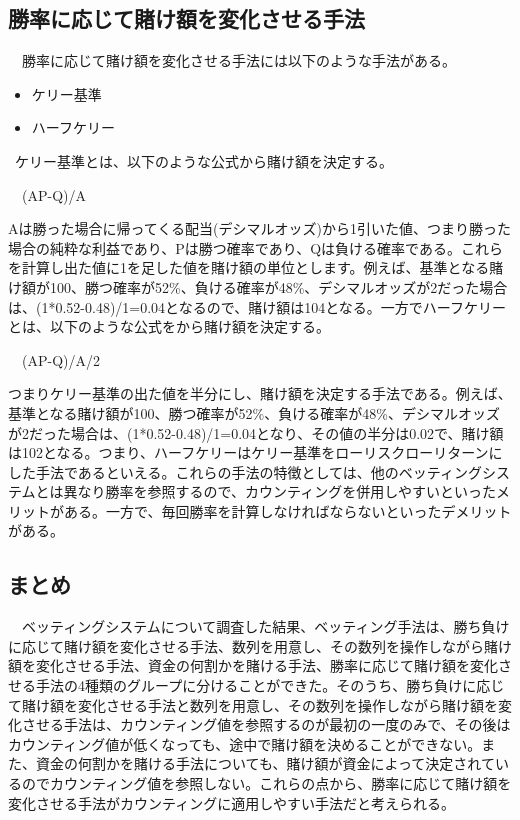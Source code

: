 \subsection{勝率に応じて賭け額を変化させる手法}
　勝率に応じて賭け額を変化させる手法には以下のような手法がある。
  \begin{itemize}
 \item ケリー基準
 \item ハーフケリー
 \end{itemize}
\ ケリー基準とは、以下のような公式から賭け額を決定する。
\begin{center}　(AP-Q)/A　
\end{center}
Aは勝った場合に帰ってくる配当(デシマルオッズ)から1引いた値、つまり勝った場合の純粋な利益であり、Pは勝つ確率であり、Qは負ける確率である。これらを計算し出た値に1を足した値を賭け額の単位とします。例えば、基準となる賭け額が100、勝つ確率が52\%、負ける確率が48\%、デシマルオッズが2だった場合は、(1*0.52-0.48)/1=0.04となるので、賭け額は104となる。一方でハーフケリーとは、以下のような公式をから賭け額を決定する。
\begin{center}　(AP-Q)/A/2
\end{center}
つまりケリー基準の出た値を半分にし、賭け額を決定する手法である。例えば、基準となる賭け額が100、勝つ確率が52\%、負ける確率が48\%、デシマルオッズが2だった場合は、(1*0.52-0.48)/1=0.04となり、その値の半分は0.02で、賭け額は102となる。つまり、ハーフケリーはケリー基準をローリスクローリターンにした手法であるといえる。これらの手法の特徴としては、他のベッティングシステムとは異なり勝率を参照するので、カウンティングを併用しやすいといったメリットがある。一方で、毎回勝率を計算しなければならないといったデメリットがある。

\subsection{まとめ}
　ベッティングシステムについて調査した結果、ベッティング手法は、勝ち負けに応じて賭け額を変化させる手法、数列を用意し、その数列を操作しながら賭け額を変化させる手法、資金の何割かを賭ける手法、勝率に応じて賭け額を変化させる手法の4種類のグループに分けることができた。そのうち、勝ち負けに応じて賭け額を変化させる手法と数列を用意し、その数列を操作しながら賭け額を変化させる手法は、カウンティング値を参照するのが最初の一度のみで、その後はカウンティング値が低くなっても、途中で賭け額を決めることができない。また、資金の何割かを賭ける手法についても、賭け額が資金によって決定されているのでカウンティング値を参照しない。これらの点から、勝率に応じて賭け額を変化させる手法がカウンティングに適用しやすい手法だと考えられる。
